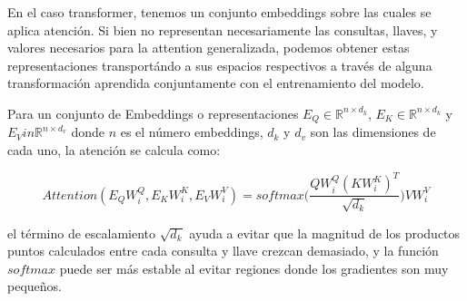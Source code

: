 En el caso transformer, tenemos un conjunto embeddings sobre las cuales se aplica atención. Si bien
no representan necesariamente las consultas, llaves, y valores necesarios para la attention generalizada,
podemos obtener estas representaciones transportándo a sus espacios respectivos a través de alguna
transformación aprendida conjuntamente con el entrenamiento del modelo.

Para un conjunto de
Embeddings o representaciones $E_Q \in \mathbb{R}^{n \times d_k}$,
$E_K \in \mathbb{R}^{n \times d_k}$ y $E_V in \mathbb{R}^{n \times d_v}$ donde $n$ es el número
embeddings, $d_k$ y $d_v$ son las dimensiones de cada uno, la atención se calcula como:

\begin{equation}
    Attention(E_QW_i^Q, E_KW_i^K, E_VW_i^V) = softmax\Big(\frac{QW_i^Q (KW_i^K)^T}{\sqrt{d_k}}\Big) VW_i^V
    \label{eq:trans_att}
\end{equation}

el término de escalamiento $\sqrt{d_k}$ ayuda a evitar que la magnitud de los productos puntos calculados
entre cada consulta y llave crezcan demasiado, y la función $softmax$ puede ser más estable al evitar
regiones donde los gradientes son muy pequeños\cite{Vaswani}.
